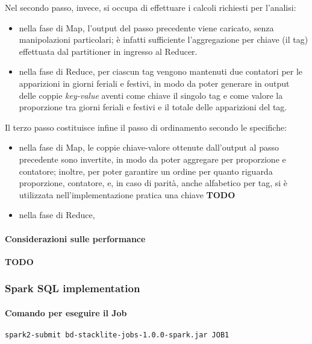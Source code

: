   Nel secondo passo, invece, si occupa di effettuare i calcoli richiesti per l'analisi:
  \begin{itemize}
    \item
      nella fase di Map, l'output del passo precedente viene caricato, senza manipolazioni particolari;
      è infatti sufficiente l'aggregazione per chiave (il tag) effettuata dal partitioner in ingresso al Reducer.
    \item
      nella fase di Reduce, per ciascun tag vengono mantenuti due contatori per le apparizioni in giorni feriali e festivi,
      in modo da poter generare in output delle coppie \textit{key-value} aventi come chiave il singolo tag e come valore la proporzione tra giorni feriali e festivi e il totale delle apparizioni del tag.
  \end{itemize}

  Il terzo passo costituisce infine il passo di ordinamento secondo le specifiche:
  \begin{itemize}
    \item
      nella fase di Map, le coppie chiave-valore ottenute dall'output al passo precedente sono invertite, in modo da poter aggregare per proporzione e contatore;
      inoltre, per poter garantire un ordine per quanto riguarda proporzione, contatore, e, in caso di parità, anche alfabetico per tag,
      si è utilizzata nell'implementazione pratica una chiave \textbf{TODO}
    \item nella fase di Reduce,
  \end{itemize}

  \paragraph{Considerazioni sulle performance}\label{par:job1:mapreduce:performance}

  \textbf{TODO}

  \subsubsection{Spark SQL implementation}\label{subsub:job1:spark}

  \paragraph{Comando per eseguire il Job}\label{par:job1:spark:cmd}

  \texttt{spark2-submit bd-stacklite-jobs-1.0.0-spark.jar JOB1}

